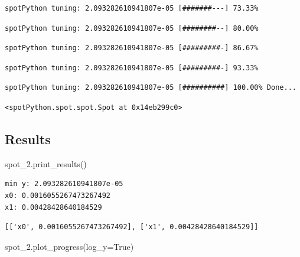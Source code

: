 \documentclass[
  letterpaper,
  DIV=11,
  numbers=noendperiod]{scrreprt}
\newenvironment{Shaded}{\begin{snugshade}}{\end{snugshade}}
\newcommand{\NormalTok}[1]{\textcolor[rgb]{0.00,0.23,0.31}{#1}}
\newcommand{\OperatorTok}[1]{\textcolor[rgb]{0.37,0.37,0.37}{#1}}
\newcommand{\VariableTok}[1]{\textcolor[rgb]{0.07,0.07,0.07}{#1}}
\begin{document}
\begin{verbatim}
spotPython tuning: 2.093282610941807e-05 [#######---] 73.33% 
\end{verbatim}

\begin{verbatim}
spotPython tuning: 2.093282610941807e-05 [########--] 80.00% 
\end{verbatim}

\begin{verbatim}
spotPython tuning: 2.093282610941807e-05 [#########-] 86.67% 
\end{verbatim}

\begin{verbatim}
spotPython tuning: 2.093282610941807e-05 [#########-] 93.33% 
\end{verbatim}

\begin{verbatim}
spotPython tuning: 2.093282610941807e-05 [##########] 100.00% Done...
\end{verbatim}

\begin{verbatim}
<spotPython.spot.spot.Spot at 0x14eb299c0>
\end{verbatim}

\hypertarget{results-1}{%
\subsection{Results}\label{results-1}}

\begin{Shaded}
\begin{Highlighting}[]
\NormalTok{spot\_2.print\_results()}
\end{Highlighting}
\end{Shaded}

\begin{verbatim}
min y: 2.093282610941807e-05
x0: 0.0016055267473267492
x1: 0.00428428640184529
\end{verbatim}

\begin{verbatim}
[['x0', 0.0016055267473267492], ['x1', 0.00428428640184529]]
\end{verbatim}

\begin{Shaded}
\begin{Highlighting}[]
\NormalTok{spot\_2.plot\_progress(log\_y}\OperatorTok{=}\VariableTok{True}\NormalTok{)}
\end{Highlighting}
\end{Shaded}
\end{document}
